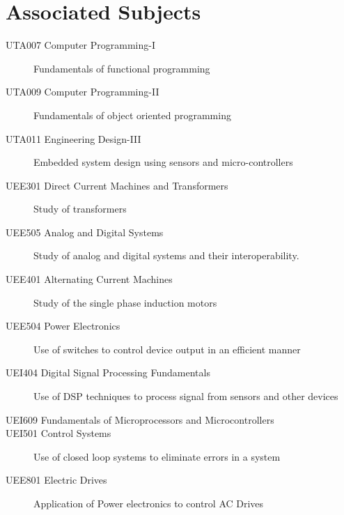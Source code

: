 \documentclass[12pt,a4paper,titlepage,twoside]{article}
\begin{document}
        \section{Associated Subjects}
            \begin{center}
                \begin{description}
                    \item [UTA007 Computer Programming-I] 
                    Fundamentals of functional programming
                    \item [UTA009 Computer Programming-II] 
                    Fundamentals of object oriented programming
                    \item [UTA011 Engineering Design-III] 
                    Embedded system design using sensors and micro-controllers
                    \item [UEE301 Direct Current Machines and Transformers]
                    Study of transformers
                    \item [UEE505 Analog and Digital Systems] 
                    Study of analog and digital systems and their interoperability.
                    \item [UEE401 Alternating Current Machines] 
                    Study of the single phase induction motors
                    \item [UEE504 Power Electronics] 
                    Use of switches to control device output in an efficient manner
                    \item [UEI404 Digital Signal Processing Fundamentals] 
                    Use of DSP techniques to process signal from sensors and other devices
                    \item [UEI609 Fundamentals of Microprocessors and Microcontrollers] 
                    \item [UEI501 Control Systems] 
                    Use of closed loop systems to eliminate errors in a system 
                    \item [UEE801 Electric Drives] 
                    Application of Power electronics to control AC Drives
                \end{description}
            \end{center}
        
\end{document}
